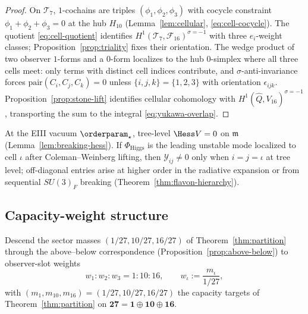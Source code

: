 \begin{proof}
On $\mathcal{T}_7$, $1$-cochains are triples $(\phi_1,\phi_2,\phi_3)$ with
cocycle constraint $\phi_1+\phi_2+\phi_3=0$ at the hub $H_{10}$
(Lemma~\ref{lem:cellular}, \eqref{eq:cell-cocycle}). The quotient
\eqref{eq:cell-quotient} identifies
$H^1(\mathcal{T}_7,\mathcal{F}_{16})^{\sigma=-1}$ with three
$e_i$-weight classes; Proposition~\ref{prop:triality} fixes their orientation.
The wedge product of two observer $1$-forms and a $0$-form localizes to the hub
$0$-simplex where all three cells meet: only terms with distinct cell indices
contribute, and $\sigma$-anti-invariance forces
$\mathrm{pair}(C_i,C_j,C_k)=0$ unless $\{i,j,k\}=\{1,2,3\}$ with orientation
$\epsilon_{ijk}$. Proposition~\ref{prop:stone-lift} identifies cellular
cohomology with $H^1(\hat Q,V_{16})^{\sigma=-1}$, transporting the sum to the
integral \eqref{eq:yukawa-overlap}.
\end{proof}

\begin{corollary}\label{cor:yukawa-diagonal}
At the EIII vacuum $\orderparam_\star$, tree-level $\Hess V=0$ on
$\mathfrak{m}$ (Lemma~\ref{lem:breaking-hess}). If
$\Phi_{\mathrm{Higgs}}$ is the leading unstable mode localized to cell
$\iota$ after Coleman--Weinberg lifting, then
$\mathcal{Y}_{ij}\neq0$ only when $i=j=\iota$ at tree level; off-diagonal
entries arise at higher order in the radiative expansion or from sequential
$SU(3)_F$ breaking (Theorem~\ref{thm:flavon-hierarchy}).
\end{corollary}

\subsection{Capacity-weight structure}
\label{sec:yukawa:weights}

Descend the sector masses $(1/27,10/27,16/27)$ of Theorem~\ref{thm:partition}
through the above--below correspondence (Proposition~\ref{prop:above-below})
to observer-slot weights
\begin{equation}\label{eq:yukawa-weights}
  w_1:w_2:w_3 = 1:10:16,
  \qquad
  w_\iota := \frac{m_\iota}{1/27},
\end{equation}
with $(m_1,m_{10},m_{16})=(1/27,10/27,16/27)$ the capacity targets of
Theorem~\ref{thm:partition} on $\mathbf{27}=\mathbf{1}\oplus\mathbf{10}\oplus\mathbf{16}$.

